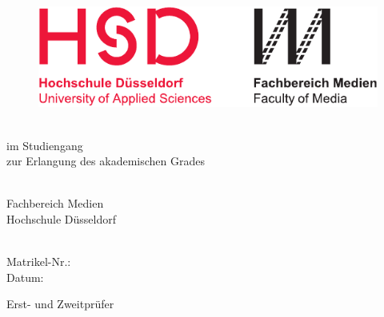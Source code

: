 
\thispagestyle{empty}

\begin{figure}
  \flushleft %
  \includegraphics[width=.5\textwidth]{figures/hsd_m_logo.pdf}
\end{figure}

\vspace*{12ex}

\hfill
\begin{minipage}{.8\textwidth}
  \begin{flushright}
    
    {\Huge\bfseries\DocumentThesisTitle\par}
    
    \vspace*{2ex}		
    
    {\large\DocumentThesisSubtitle}
    
    \vspace*{12ex}
    
    \onehalfspacing
    
    \textbf{\DocumentThesisType}\\
    \vspace*{1ex}
    im Studiengang \DocumentThesisCourse\\
    zur Erlangung des akademischen Grades\\
    \DocumentThesisDegree\\
    
    \vspace*{8ex}
    
    Fachbereich Medien\\
    Hochschule Düsseldorf
    
    \vspace*{12ex}
    
    \DocumentAuthorPrename\ \DocumentAuthorName\\
    Matrikel-Nr.: \DocumentThesisMatr\\
    Datum: \DocumentThesisDateCover
    
    \vspace*{12ex}
    
    Erst- und Zweitprüfer\\
    \vspace*{1ex}
    \DocumentThesisFirstExaminer\\
    \DocumentThesisSecondExaminer
    
  \end{flushright}
\end{minipage}
